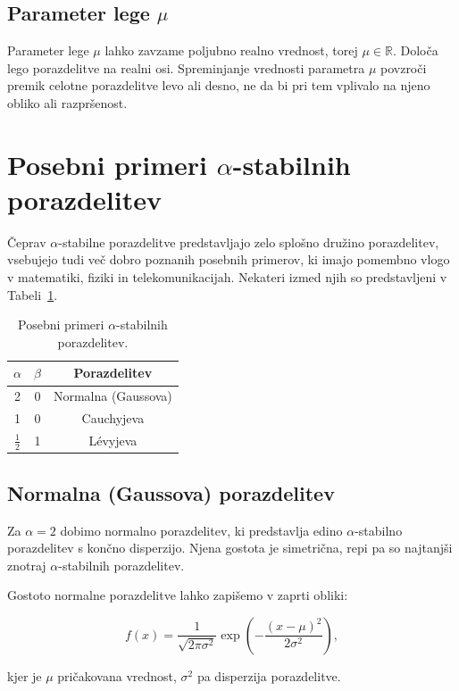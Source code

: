 \documentclass[a4paper, 12pt, openany]{book}
\begin{document}
\subsection{Parameter lege $\mu$}
\enlargethispage{4\baselineskip}

Parameter lege $\mu$ lahko zavzame poljubno realno vrednost, torej $\mu\in\mathbb{R}$. Določa lego porazdelitve na realni osi. Spreminjanje vrednosti parametra $\mu$ povzroči premik celotne porazdelitve levo ali desno, ne da bi pri tem vplivalo na njeno obliko ali razpršenost.

\section{Posebni primeri $\alpha$-stabilnih porazdelitev}

Čeprav $\alpha$-stabilne porazdelitve predstavljajo zelo splošno družino porazdelitev, vsebujejo tudi več dobro poznanih posebnih primerov, ki imajo pomembno vlogo v matematiki, fiziki in telekomunikacijah. Nekateri izmed njih so predstavljeni v Tabeli~\ref{tab:alpha_special_cases}.

\begin{table}[H]
\centering
\begin{tabular}{ccc}
\hline
$\alpha$ & $\beta$ & Porazdelitev \\
\hline
2 & 0 & Normalna (Gaussova) \\
1 & 0 & Cauchyjeva \\
$\frac{1}{2}$ & 1 & Lévyjeva \\
\hline
\end{tabular}
\caption{Posebni primeri $\alpha$-stabilnih porazdelitev.}
\label{tab:alpha_special_cases}
\end{table}


\subsection{Normalna (Gaussova) porazdelitev}
Za $\alpha=2$ dobimo normalno porazdelitev, ki predstavlja edino $\alpha$-stabilno porazdelitev s končno disperzijo. Njena gostota je simetrična, repi pa so najtanjši znotraj $\alpha$-stabilnih porazdelitev. 

Gostoto normalne porazdelitve lahko zapišemo v zaprti obliki:

\[
f(x)=
\frac{1}{\sqrt{2\pi\sigma^2}}
\exp\left(
-\frac{(x-\mu)^2}{2\sigma^2}
\right),
\]

kjer je $\mu$ pričakovana vrednost, $\sigma^2$ pa disperzija porazdelitve.
\end{document}
